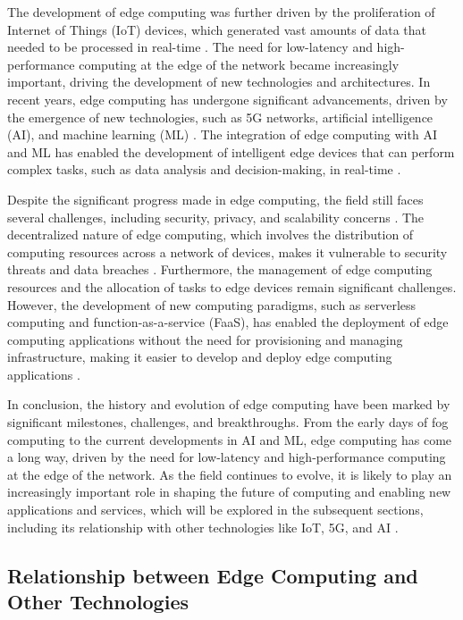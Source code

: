 \documentclass[11pt]{article}
\begin{document}
The development of edge computing was further driven by the proliferation of Internet of Things (IoT) devices, which generated vast amounts of data that needed to be processed in real-time \cite{ref13}. The need for low-latency and high-performance computing at the edge of the network became increasingly important, driving the development of new technologies and architectures. In recent years, edge computing has undergone significant advancements, driven by the emergence of new technologies, such as 5G networks, artificial intelligence (AI), and machine learning (ML) \cite{ref8}. The integration of edge computing with AI and ML has enabled the development of intelligent edge devices that can perform complex tasks, such as data analysis and decision-making, in real-time \cite{ref14}.

Despite the significant progress made in edge computing, the field still faces several challenges, including security, privacy, and scalability concerns \cite{ref5}. The decentralized nature of edge computing, which involves the distribution of computing resources across a network of devices, makes it vulnerable to security threats and data breaches \cite{ref15}. Furthermore, the management of edge computing resources and the allocation of tasks to edge devices remain significant challenges. However, the development of new computing paradigms, such as serverless computing and function-as-a-service (FaaS), has enabled the deployment of edge computing applications without the need for provisioning and managing infrastructure, making it easier to develop and deploy edge computing applications \cite{ref16}.

In conclusion, the history and evolution of edge computing have been marked by significant milestones, challenges, and breakthroughs. From the early days of fog computing to the current developments in AI and ML, edge computing has come a long way, driven by the need for low-latency and high-performance computing at the edge of the network. As the field continues to evolve, it is likely to play an increasingly important role in shaping the future of computing and enabling new applications and services, which will be explored in the subsequent sections, including its relationship with other technologies like IoT, 5G, and AI \cite{ref17}.

\subsection{Relationship between Edge Computing and Other Technologies}
\end{document}
